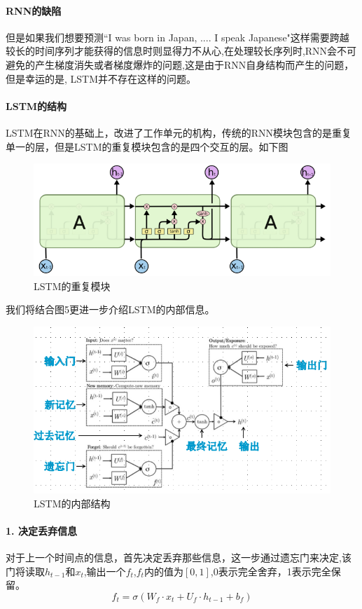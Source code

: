 \documentclass[UTF8]{ctexart}
\begin{document}
\paragraph*{RNN的缺陷}
但是如果我们想要预测“I was born in Japan, .... I speak Japanese"这样需要跨越较长的时间序列才能获得的信息时则显得力不从心,在处理较长序列时,RNN会不可避免的产生梯度消失或者梯度爆炸的问题,这是由于RNN自身结构而产生的问题，但是幸运的是, LSTM并不存在这样的问题。
\paragraph*{LSTM的结构}
LSTM在RNN的基础上，改进了工作单元的机构，传统的RNN模块包含的是重复单一的层，但是LSTM的重复模块包含的是四个交互的层。如下图
\begin{figure}[!htbp]
    \centering
    \includegraphics[scale = 0.8]{p4.png}
    \caption{LSTM的重复模块\cite{1}}
\end{figure}
我们将结合图5更进一步介绍LSTM的内部信息。
\begin{figure}[!htbp]
    \centering
    \includegraphics[scale = 0.8]{p5.png}
    \caption{LSTM的内部结构\cite{2}}
\end{figure}
\paragraph*{1. 决定丢弃信息}对于上一个时间点的信息，首先决定丢弃那些信息，这一步通过遗忘门来决定,该门将读取$h_{t-1}$和$x_t$,输出一个$f_t$,$f_t$内的值为$[0,1]$,0表示完全舍弃，1表示完全保留。
$$f_t = \sigma(W_f\cdot x_t + U_f\cdot h_{t-1} + b_f)$$
\end{document}
